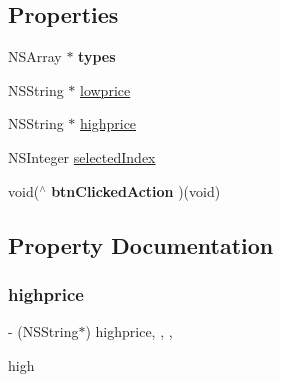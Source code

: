 \subsection*{Properties}
\begin{DoxyCompactItemize}
\item 
\mbox{\label{interface_f_n_f_g_filter_element_view_a503472b90bfe0e5fe4fa4c4e442e0d63}} 
N\+S\+Array $\ast$ {\bfseries types}
\item 
N\+S\+String $\ast$ \mbox{\hyperlink{interface_f_n_f_g_filter_element_view_a26c1696023ec27cb58aa22a6223b5a16}{lowprice}}
\item 
N\+S\+String $\ast$ \mbox{\hyperlink{interface_f_n_f_g_filter_element_view_a1d01b73c2a1b2ae1f4cd4abaace62c67}{highprice}}
\item 
N\+S\+Integer \mbox{\hyperlink{interface_f_n_f_g_filter_element_view_a935a417638f682acf786e671251143ae}{selected\+Index}}
\item 
\mbox{\label{interface_f_n_f_g_filter_element_view_a2ad866522361cbdebc03b84cb4e77495}} 
void($^\wedge$ {\bfseries btn\+Clicked\+Action} )(void)
\end{DoxyCompactItemize}


\subsection{Property Documentation}
\mbox{\label{interface_f_n_f_g_filter_element_view_a1d01b73c2a1b2ae1f4cd4abaace62c67}} 
\subsubsection{\texorpdfstring{highprice}{highprice}}
{\footnotesize\ttfamily -\/ (N\+S\+String$\ast$) highprice\hspace{0.3cm}{\ttfamily [read]}, {\ttfamily [write]}, {\ttfamily [nonatomic]}, {\ttfamily [copy]}}

high \mbox{\label{interface_f_n_f_g_filter_element_view_a26c1696023ec27cb58aa22a6223b5a16}} 
